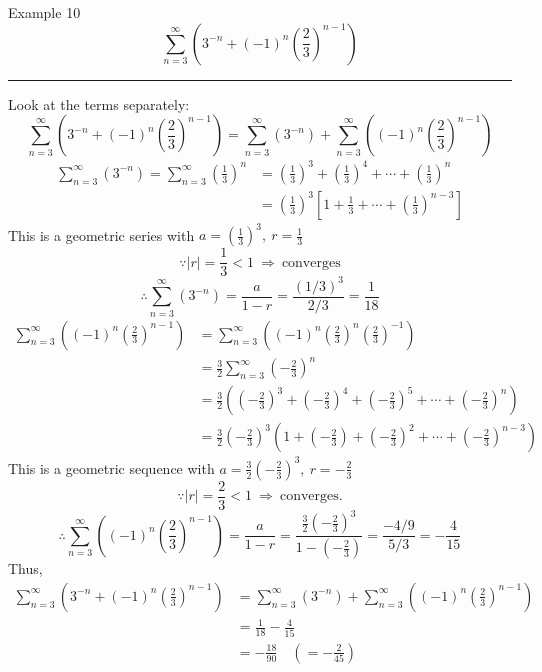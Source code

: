 \documentclass[12pt,a4paper]{article}
\begin{document}
\begin{eg}{Example 10}
	$$\sum^\infty_{n=3}\left(3^{-n}+(-1)^n\left(\frac{2}{3}\right)^{n-1}\right)$$
	\noindent\rule[0.25\baselineskip]{\textwidth}{1pt}
	Look at the terms separately: 
	$$\sum^\infty_{n=3}\left(3^{-n}+(-1)^n\left(\frac{2}{3}\right)^{n-1}\right)=\sum^\infty_{n=3}(3^{-n})+\sum^\infty_{n=3}\left((-1)^n\left(\frac{2}{3}\right)^{n-1}\right)$$
	$$\begin{aligned}
		\sum^\infty_{n=3}(3^{-n})=\sum^\infty_{n=3}\left(\frac{1}{3}\right)^n&=\left(\frac{1}{3}\right)^3+\left(\frac{1}{3}\right)^4+\cdots+\left(\frac{1}{3}\right)^n\\
		&=\left(\frac{1}{3}\right)^3\left[1+\frac{1}{3}+\cdots+\left(\frac{1}{3}\right)^{n-3}\right]
	\end{aligned}$$
	This is a geometric series with $\displaystyle a=\left(\frac{1}{3}\right)^3,\ r=\frac{1}{3}$
	$$\because|r|=\frac{1}{3}<1\ \Rightarrow\ \text{converges}$$
	$$\therefore\sum^\infty_{n=3}(3^{-n})=\frac{a}{1-r}=\frac{(1/3)^3}{2/3}=\frac{1}{18}$$
	$$\begin{aligned}
		\sum^\infty_{n=3}\left((-1)^n\left(\frac{2}{3}\right)^{n-1}\right)&=\sum^\infty_{n=3}\left((-1)^n\left(\frac{2}{3}\right)^n\left(\frac{2}{3}\right)^{-1}\right)\\
		&=\frac{3}{2}\sum^\infty_{n=3}\left(-\frac{2}{3}\right)^n\\
		&=\frac{3}{2}\left(\left(-\frac{2}{3}\right)^3+\left(-\frac{2}{3}\right)^4+\left(-\frac{2}{3}\right)^5+\cdots+\left(-\frac{2}{3}\right)^n\right)\\
		&=\frac{3}{2}\left(-\frac{2}{3}\right)^3\left(1+\left(-\frac{2}{3}\right)+\left(-\frac{2}{3}\right)^2+\cdots+\left(-\frac{2}{3}\right)^{n-3}\right)
	\end{aligned}$$
	This is a geometric sequence with $\displaystyle a=\frac{3}{2}\left(-\frac{2}{3}\right)^3,\ r=-\frac{2}{3}$
	$$\because |r|=\frac{2}{3}<1\ \Rightarrow\ \text{converges}.$$
	$$\therefore\sum^\infty_{n=3}\left((-1)^n\left(\frac{2}{3}\right)^{n-1}\right)=\frac{a}{1-r}=\frac{\frac{3}{2}\left(-\frac{2}{3}\right)^3}{1-\left(-\frac{2}{3}\right)}=\frac{-4/9}{5/3}=-\frac{4}{15}$$
	Thus, 
	$$\begin{aligned}
		\sum^\infty_{n=3}\left(3^{-n}+(-1)^n\left(\frac{2}{3}\right)^{n-1}\right)&=\sum^\infty_{n=3}(3^{-n})+\sum^\infty_{n=3}\left((-1)^n\left(\frac{2}{3}\right)^{n-1}\right)\\
		&=\frac{1}{18}-\frac{4}{15}\\
		&=-\frac{18}{90}\quad\left(=-\frac{2}{45}\right)
	\end{aligned}$$
\end{eg}
\end{document}

